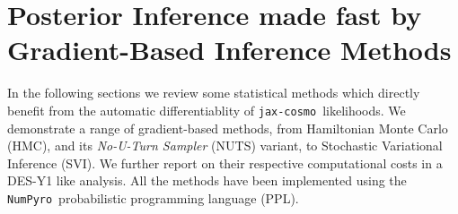 \documentclass[twocolumn,twocolappendix,nofootinbib,iop]{openjournal}
\newcommand{\numpyro}{\texttt{NumPyro}}
\newcommand{\jaxcosmo}{\texttt{jax-cosmo}}
\begin{document}
%
\section{Posterior Inference made fast by Gradient-Based Inference Methods}
\label{sec:chmc}
%
In the following sections we review some statistical methods which directly benefit from the automatic differentiablity of \jaxcosmo\ likelihoods. We demonstrate a range of gradient-based methods, from Hamiltonian Monte Carlo (HMC), and its \textit{No-U-Turn Sampler} (NUTS) variant, to Stochastic Variational Inference (SVI). We further report on their respective computational costs in a DES-Y1 like analysis. All  the methods have been implemented using the \numpyro\ probabilistic programming language (PPL). 
%
%
%
\end{document}

